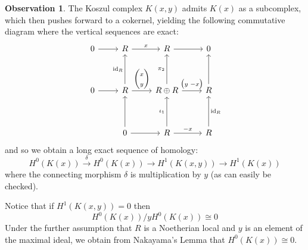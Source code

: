 \documentclass[12pt]{article}
\theoremstyle{plain}
\theoremstyle{definition}
\newtheorem{observation}[thm]{Observation}
\newcommand{\lto}{\longrightarrow}
\begin{document}
\begin{observation}
The Koszul complex $K(x,y)$ admits $K(x)$ as a subcomplex, which then pushes forward to a cokernel, yielding the following commutative diagram where the vertical sequences are exact:
\begin{equation}\label{eq:sub_quotient}
\begin{tikzcd}[row sep = huge]
0\arrow[r] & R\arrow[r,"{x}"] & R\arrow[r] & 0\\
0\arrow[r] & R\arrow[u,"{\operatorname{id}_R}"]\arrow[r,"{\begin{pmatrix}
x\\
y
\end{pmatrix}
}"] & R \oplus R\arrow[r,"{\begin{pmatrix}
y \text{  } -x
\end{pmatrix}
}"]\arrow[u,"{\pi_2}"] & R\arrow[u]\\
& 0\arrow[u]\arrow[r] & R\arrow[r,"{-x}"]\arrow[u,"{\iota_1}"] & R\arrow[u,swap,"{\operatorname{id}_R}"]
\end{tikzcd}
\end{equation}
and so we obtain a long exact sequence of homology:
\begin{equation}
H^0(K(x)) \stackrel{\delta}{\lto} H^0(K(x)) \lto H^1(K(x,y)) \lto H^1(K(x))
\end{equation}
where the connecting morphism $\delta$ is multiplication by $y$ (as can easily be checked).

Notice that if $H^1(K(x,y))=0$ then
\begin{equation}
H^0(K(x))/yH^0(K(x)) \cong 0
\end{equation}
Under the further assumption that $R$ is a Noetherian local and $y$ is an element of the maximal ideal, we obtain from Nakayama's Lemma that $H^0(K(x)) \cong 0$.


\end{observation}
\end{document}
